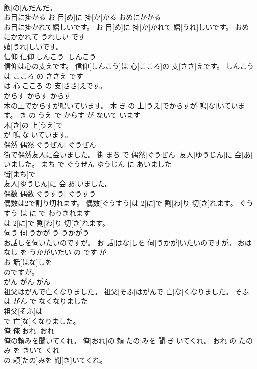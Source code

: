 \documentclass[8pt]{extreport}
\begin{document}
\begin{CJK}{UTF8}{min}
\\	飲[の]んだんだ。			
\\	お目に掛かる	お 目[め]に 掛[か]かる	おめにかかる	
\\	お目に掛かれて嬉しいです。	お 目[め]に 掛[か]かれて 嬉[うれ]しいです。	おめにかかれて うれしい です	
\\	嬉[うれ]しいです。			
\\	信仰	信仰[しんこう]	しんこう	
\\	信仰は心の支えです。	信仰[しんこう]は 心[こころ]の 支[ささ]えです。	しんこう は こころ の ささえ です	
\\	は 心[こころ]の 支[ささ]えです。			
\\	からす	からす	からす	
\\	木の上でからすが鳴いています。	木[き]の 上[うえ]でからすが 鳴[な]いています。	き の うえ で からす が ないて います	
\\	木[き]の 上[うえ]で
\\	が 鳴[な]いています。			
\\	偶然	偶然[ぐうぜん]	ぐうぜん	
\\	街で偶然友人に会いました。	街[まち]で 偶然[ぐうぜん] 友人[ゆうじん]に 会[あ]いました。	まち で ぐうぜん ゆうじん に あいました	
\\	街[まち]で
\\	友人[ゆうじん]に 会[あ]いました。			
\\	偶数	偶数[ぐうすう]	ぐうすう	
\\	偶数は2で割り切れます。	偶数[ぐうすう]は 2[に]で 割[わ]り 切[き]れます。	ぐうすう は に で わりきれます	
\\	は 2[に]で 割[わ]り 切[き]れます。			
\\	伺う	伺[うかが]う	うかがう	
\\	お話しを伺いたいのですが。	お 話[はな]しを 伺[うかが]いたいのですが。	おはなし を うかがいたい の です が	
\\	お 話[はな]しを
\\	のですが。			
\\	がん	がん	がん	
\\	祖父はがんで亡くなりました。	祖父[そふ]はがんで 亡[な]くなりました。	そふ は がん で なくなりました	
\\	祖父[そふ]は
\\	で 亡[な]くなりました。			
\\	俺	俺[おれ]	おれ	
\\	俺の頼みを聞いてくれ。	俺[おれ]の 頼[たの]みを 聞[き]いてくれ。	おれ の たのみ を きいて くれ	
\\	の 頼[たの]みを 聞[き]いてくれ。			

\end{CJK}
\end{document}
